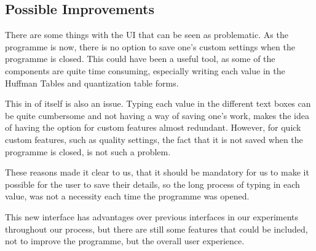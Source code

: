 \subsection{Possible Improvements}
There are some things with the UI that can be seen as problematic.
As the programme is now, there is no option to save one's custom settings when the programme is closed.
This could have been a useful tool, as some of the components are quite time consuming, especially writing each value in the Huffman Tables and quantization table forms.

This in of itself is also an issue.
Typing each value in the different text boxes can be quite cumbersome and not having a way of saving one's work, makes the idea of having the option for custom features almost redundant.
However, for quick custom features, such as quality settings, the fact that it is not saved when the programme is closed, is not such a problem.

These reasons made it clear to us, that it should be mandatory for us to make it possible for the user to save their details, so the long process of typing in each value, was not a necessity each time the programme was opened.

This new interface has advantages over previous interfaces in our experiments throughout our process, but there are still some features that could be included, not to improve the programme, but the overall user experience.


